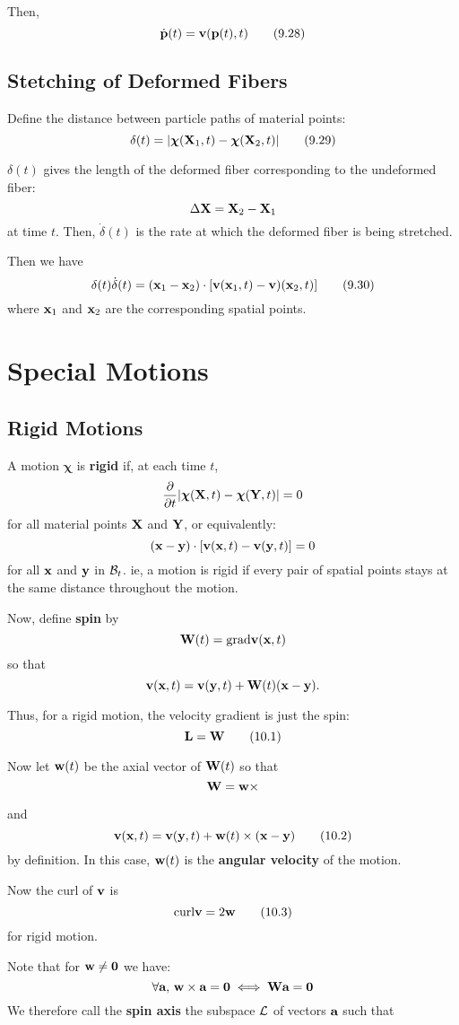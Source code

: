 \documentclass{article}
\newcommand{\Chi}{\boldsymbol{\chi}}
\begin{document}
Then,
\[
	\dot{\textbf{p}}(t) = \textbf{v}(\textbf{p}(t),t)\tag{9.28}
\]
\subsection{Stetching of Deformed Fibers}
Define the distance between particle paths of material points:
\[
	\delta(t) = |\Chi(\X_1,t) - \Chi(\X_2,t)|\tag{9.29}
\]

\begin{remark}
	$\delta(t)$ gives the length of the deformed fiber corresponding to the undeformed fiber:
	$$\Delta\textbf{X} = \textbf{X}_2 - \textbf{X}_1$$
	at time $t$. Then, $\dot{\delta}(t)$ is the rate at which the deformed fiber is being stretched.
\end{remark}

Then we have
\[
	\delta(t)\dot{\delta}(t) = (\textbf{x}_1-\textbf{x}_2)\cdot[\textbf{v}(\textbf{x}_1,t) - \textbf{v})(\textbf{x}_2,t)]\tag{9.30}
\]
where $\textbf{x}_1$ and $\textbf{x}_2$ are the corresponding spatial points.

\section{Special Motions}
\subsection{Rigid Motions}
A motion $\Chi$ is \textbf{rigid} if, at each time $t$,
$$\pd{}{t}|\Chi(\X,t) - \Chi(\Y,t)| = 0$$
for all material points $\textbf{X}$ and $\textbf{Y}$, or equivalently:
$$(\textbf{x} - \textbf{y})\cdot[\textbf{v}(\textbf{x},t) - \textbf{v}(\textbf{y},t)] = 0$$
for all $\textbf{x}$ and $\textbf{y}$ in $\mathcal{B}_t$.
ie, a motion is rigid if every pair of spatial points stays at the same distance throughout the motion.

Now, define \textbf{spin} by
\[
	\textbf{W}(t) = \text{grad}\textbf{v}(\textbf{x},t)
\]
so that
\[
	\textbf{v}(\textbf{x},t) = \textbf{v}(\textbf{y},t) + \textbf{W}(t)(\textbf{x}-\textbf{y}).
\]

Thus, for a rigid motion, the velocity gradient is just the spin:
\[
	\textbf{L} = \textbf{W}\tag{10.1}
\]

Now let $\textbf{w}(t)$ be the axial vector of $\textbf{W}(t)$ so that
\[
	\textbf{W} = \textbf{w}\times
\]

and
\[
	\textbf{v}(\textbf{x},t) = \textbf{v}(\textbf{y},t) + \textbf{w}(t)\times(\textbf{x}-\textbf{y})\tag{10.2}
\]
by definition.
In this case, $\textbf{w}(t)$ is the \textbf{angular velocity} of the motion.

Now the curl of $\textbf{v}$ is 
\[
	\text{curl}\textbf{v} = 2\textbf{w}\tag{10.3}
\]
for rigid motion.

Note that for $\textbf{w} \ne \textbf{0}$ we have:
$$\forall\textbf{a}, \, \textbf{w}\times\textbf{a}=\textbf{0} \iff \textbf{W}\textbf{a}=\textbf{0}$$
We therefore call the \textbf{spin axis} the subspace $\mathcal{L}$ of vectors $\textbf{a}$ such that
\end{document}
